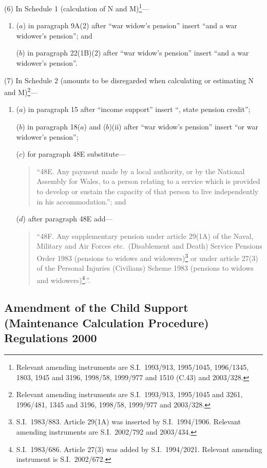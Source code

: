 \documentclass[12pt,a4paper]{article}
\begin{document}
(6) In Schedule 1 (calculation of N and M)\footnote{Relevant amending instruments are S.I.\ 1993/913, 1995/1045, 1996/1345, 1803, 1945 and 3196, 1998/58, 1999/977 and 1510 (C.43) and 2003/328.}—
\begin{enumerate}\item[]
($a$) in paragraph 9A(2) after “war widow’s pension” insert “and a war widower’s pension”; and

($b$) in paragraph 22(1B)(2) after “war widow’s pension” insert “and a war widower’s pension”.
\end{enumerate}

(7) In Schedule 2 (amounts to be disregarded when calculating or estimating N and M)\footnote{Relevant amending instruments are S.I.\ 1993/913, 1995/1045 and 3261, 1996/481, 1345 and 3196, 1998/58, 1999/977 and 2003/328.}—
\begin{enumerate}\item[]
($a$) in paragraph 15 after “income support” insert “, state pension credit”;

($b$) in paragraph 18($a$)  and ($b$)(ii)  after “war widow’s pension” insert “or war widower’s pension”;

($c$) for paragraph 48E substitute—
\begin{quotation}
“48E.  Any payment made by a local authority, or by the National Assembly for Wales, to a person relating to a service which is provided to develop or sustain the capacity of that person to live independently in his accommodation.”; and
\end{quotation}

($d$) after paragraph 48E add—
\begin{quotation}
“48F.  Any supplementary pension under article 29(1A) of the Naval, Military and Air Forces etc.\ (Disablement and Death) Service Pensions Order 1983 (pensions to widows and widowers)\footnote{S.I.\ 1983/883. Article 29(1A) was inserted by S.I.\ 1994/1906. Relevant amending instruments are S.I.\ 2002/792 and 2003/434.} or under article 27(3) of the Personal Injuries (Civilians) Scheme 1983 (pensions to widows and widowers)\footnote{S.I.\ 1983/686. Article 27(3) was added by S.I.\ 1994/2021. Relevant amending instrument is S.I.\ 2002/672.}.”.
\end{quotation}
\end{enumerate}

\subsection[5. Amendment of the Child Support (Maintenance Calculation Procedure) Regulations 2000]{Amendment of the Child Support (Maintenance Calculation Procedure) Regulations 2000}
\end{document}
